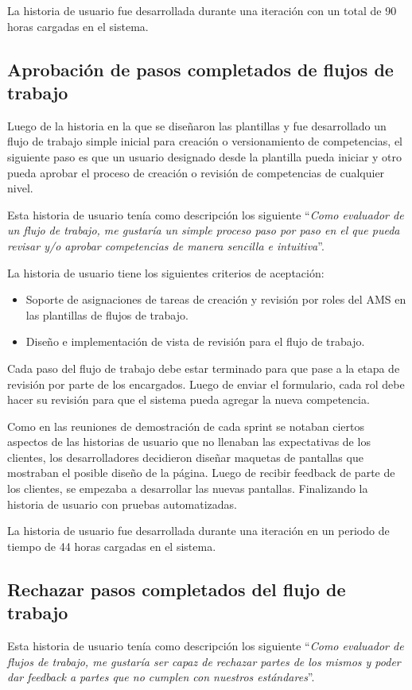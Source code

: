 La historia de usuario fue desarrollada durante una iteración con un total de 90 horas cargadas en el sistema.

\subsection{Aprobación de pasos completados de flujos de trabajo}

Luego de la historia en la que se diseñaron las plantillas y fue desarrollado un flujo de trabajo simple inicial para creación o versionamiento de competencias, el siguiente paso es que un usuario designado desde la plantilla pueda iniciar y otro pueda aprobar el proceso de creación o revisión de competencias de cualquier nivel.

Esta historia de usuario tenía como descripción los siguiente \enquote{\textit{Como evaluador de un flujo de trabajo, me gustaría un simple proceso paso por paso en el que pueda revisar y/o aprobar competencias de manera sencilla e intuitiva}}.

La historia de usuario tiene los siguientes criterios de aceptación:
\begin{itemize}
	\item Soporte de asignaciones de tareas de creación y revisión por roles del AMS en las plantillas de flujos de trabajo.
	\item Diseño e implementación de vista de revisión para el flujo de trabajo.
\end{itemize}

Cada paso del flujo de trabajo debe estar terminado para que pase a la etapa de revisión por parte de los encargados. Luego de enviar el formulario, cada rol debe hacer su revisión para que el sistema pueda agregar la nueva competencia.

Como en las reuniones de demostración de cada sprint se notaban ciertos aspectos de las historias de usuario que no llenaban las expectativas de los clientes, los desarrolladores decidieron diseñar maquetas de pantallas que mostraban el posible diseño de la página. Luego de recibir feedback de parte de los clientes, se empezaba a desarrollar las nuevas pantallas. Finalizando la historia de usuario con pruebas automatizadas.

La historia de usuario fue desarrollada durante una iteración en un periodo de tiempo de 44 horas cargadas en el sistema.

\subsection{Rechazar pasos completados del flujo de trabajo}
Esta historia de usuario tenía como descripción los siguiente \enquote{\textit{Como evaluador de flujos de trabajo, me gustaría ser capaz de rechazar partes de los mismos y poder dar feedback a partes que no cumplen con nuestros estándares}}.

